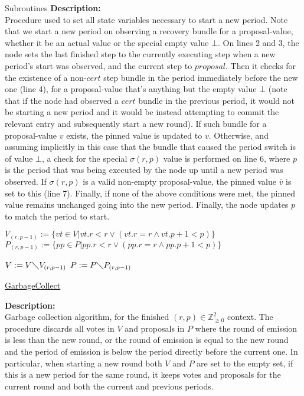 \documentclass[10pt,a4paper]{article}
\begin{document}
\begin{section}{Subroutines}
\noindent \textbf{Description:}\\
Procedure used to set all state variables necessary to start a new period.
Note that we start a new period on observing a recovery bundle for a proposal-value, whether it be
an actual value or the special empty value $\bot$.
On lines 2 and 3, the node sets the last finished step to the currently executing step when a new period's
start was observed, and the current step to $proposal$.
Then it checks for the existence of a non-$cert$ step bundle in the period immediately before the new one (line 4), 
for a proposal-value that's anything but the empty value $\bot$ (note that if the node had observed a $cert$
bundle in the previous period, it would not be starting a new period and it would be instead attempting to commit
the relevant entry and subsequently start a new round). If such bundle for a proposal-value $v$ exists, the pinned 
value is updated to $v$.
Otherwise, and assuming implicitly in this case that the bundle that caused the period switch is of value $\bot$,
a check for the special $\sigma(r,p)$ value is performed on line 6, where $p$ is the period that was being executed 
by the node up until a new period was observed. If $\sigma(r,p)$ is a valid non-empty proposal-value, the pinned 
value $\bar{v}$ is set to this (line 7).
Finally, if none of the above conditions were met, the pinned value remains unchanged going into the new period.
Finally, the node updates $p$ to match the period to start.


\begin{algorithm}[H]\label{algo:garbage-collect}
    \begin{algorithmic}[1]

    \State $V_{(r,p-1)} := \{ vt \in V | vt.r < r \lor (vt.r=r \land vt.p + 1 < p) \}$
    \State $P_{(r,p-1)} := \{ pp \in P | pp.r < r \lor (pp.r=r \land pp.p + 1 < p) \}$

    \State $V := V\diagdown V_{(r,p-1)}$
    \State $P := P\diagdown P_{(r,p-1)}$

    \EndFunction
    \end{algorithmic}
    \caption{\underline{GarbageCollect}}
\end{algorithm}

\noindent \textbf{Description:}\\
Garbage collection algorithm, for the finished $(r,p)\in\mathbb{Z}_{\ge 0}^2$ context.
The procedure discards all votes in $V$ and proposals in $P$ where the round of emission is less than the
new round, or the round of emission is equal to the new round and the period of emission is below the period
directly before the current one.
In particular, when starting a new round both $V$ and $P$ are set to the empty set,
if this is a new period for the same round, it keeps votes and proposals for the current round
and both the current and previous periods.


\end{section}
\end{document}
